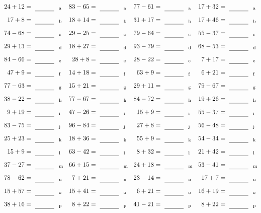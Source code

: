 \documentclass
[
  draft    = true,
  fontsize = 11pt,
  parskip  = half-
]
{scrartcl}
\begin{document}
\clearpage
\begin{align*}
    \pline{24+12}&=\rline{a}
  & \pline{83-65}&=\rline{a}
  & \pline{77-61}&=\rline{a}
  & \pline{17+32}&=\rline{a} \\[1ex]
    \pline{17+8}&=\rline{b}
  & \pline{18+14}&=\rline{b}
  & \pline{31+17}&=\rline{b}
  & \pline{17+46}&=\rline{b} \\[1ex]
    \pline{74-68}&=\rline{c}
  & \pline{29-25}&=\rline{c}
  & \pline{79-64}&=\rline{c}
  & \pline{55-37}&=\rline{c} \\[1ex]
    \pline{29+13}&=\rline{d}
  & \pline{18+27}&=\rline{d}
  & \pline{93-79}&=\rline{d}
  & \pline{68-53}&=\rline{d} \\[1ex]
    \pline{84-66}&=\rline{e}
  & \pline{28+8}&=\rline{e}
  & \pline{28-22}&=\rline{e}
  & \pline{7+17}&=\rline{e} \\[1ex]
    \pline{47+9}&=\rline{f}
  & \pline{14+18}&=\rline{f}
  & \pline{63+9}&=\rline{f}
  & \pline{6+21}&=\rline{f} \\[1ex]
    \pline{77-63}&=\rline{g}
  & \pline{15+21}&=\rline{g}
  & \pline{29+11}&=\rline{g}
  & \pline{79-67}&=\rline{g} \\[1ex]
    \pline{38-22}&=\rline{h}
  & \pline{77-67}&=\rline{h}
  & \pline{84-72}&=\rline{h}
  & \pline{19+26}&=\rline{h} \\[1ex]
    \pline{9+19}&=\rline{i}
  & \pline{47-26}&=\rline{i}
  & \pline{15+9}&=\rline{i}
  & \pline{55-37}&=\rline{i} \\[1ex]
    \pline{83-75}&=\rline{j}
  & \pline{96-84}&=\rline{j}
  & \pline{27+8}&=\rline{j}
  & \pline{56-48}&=\rline{j} \\[1ex]
    \pline{25+23}&=\rline{k}
  & \pline{18+36}&=\rline{k}
  & \pline{55+9}&=\rline{k}
  & \pline{54-34}&=\rline{k} \\[1ex]
    \pline{15+9}&=\rline{l}
  & \pline{63-42}&=\rline{l}
  & \pline{8+32}&=\rline{l}
  & \pline{21+42}&=\rline{l} \\[1ex]
    \pline{37-27}&=\rline{m}
  & \pline{66+15}&=\rline{m}
  & \pline{24+18}&=\rline{m}
  & \pline{53-41}&=\rline{m} \\[1ex]
    \pline{78-62}&=\rline{n}
  & \pline{7+21}&=\rline{n}
  & \pline{23-14}&=\rline{n}
  & \pline{17+7}&=\rline{n} \\[1ex]
    \pline{15+57}&=\rline{o}
  & \pline{15+41}&=\rline{o}
  & \pline{6+21}&=\rline{o}
  & \pline{16+19}&=\rline{o} \\[1ex]
    \pline{38+16}&=\rline{p}
  & \pline{8+22}&=\rline{p}
  & \pline{41-21}&=\rline{p}
  & \pline{8+22}&=\rline{p}
\end{align*}
\end{document}

